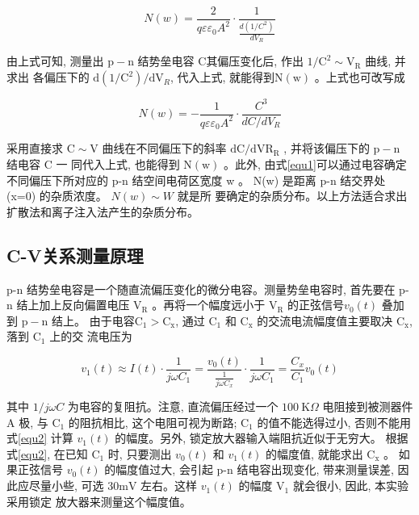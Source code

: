\documentclass{buaaemp}
\begin{document}
\begin{equation*}
    N(w)=\frac{2}{q \varepsilon \varepsilon_{0} A^{2}} \cdot \frac{1}{\frac{d\left(1 / C^{2}\right)}{d V_{R}}}
\end{equation*}

由上式可知, 测量出 $ \mathrm{p}-\mathrm{n}$  结势垒电容 $ \mathrm{C}  $其偏压变化后, 作出 $ 1 / \mathrm{C}^{2} \sim \mathrm{V}_{\mathrm{R}} $ 曲线, 并求出 各偏压下的 $ \mathrm{d}\left(1 / \mathrm{C}^{2}\right) / \mathrm{dV}_{R} $, 代入上式, 就能得到$  \mathrm{N}(\mathrm{w})$  。上式也可改写成

\begin{equation*}
    N(w)=-\frac{1}{q \varepsilon \varepsilon_{0} A^{2}} \cdot \frac{C^{3}}{d C / d V_{R}}
\end{equation*}

采用直接求 $ \mathrm{C} \sim \mathrm{V}$  曲线在不同偏压下的斜率 $ \mathrm{dC} / \mathrm{dV} \mathrm{R}_{\mathrm{R}}$ , 并将该偏压下的 $ \mathrm{p}-\mathrm{n}$  结电容 $ \mathrm{C}$ 一  同代入上式, 也能得到 $ \mathrm{N}(\mathrm{w}) $ 。此外, 由式\ref{equ1}可以通过电容确定不同偏压下所对应的  p-n  结空间电荷区宽度  w 。 N(w)  是距离  p-n  结交界处  (x=0)  的杂质浓度。 $ N(w) \sim W$  就是所 要确定的杂质分布。以上方法适合求出扩散法和离子注入法产生的杂质分布。
\subsection{C-V关系测量原理}\cite{钱建强2016近代物理实验}
 p-n  结势垒电容是一个随直流偏压变化的微分电容。测量势垒电容时, 首先要在 p-n 结上加上反向偏置电压 $ \mathrm{V}_{\mathrm{R}}$  。再将一个幅度远小于  $\mathrm{V}_{\mathrm{R}}$  的正弦信号$  v_{0}(t) $ 叠加到 $ \mathrm{p}-\mathrm{n} $ 结上。 由于电容$  \mathrm{C}_{1}>\mathrm{C}_{\mathrm{x}} $, 通过  $\mathrm{C}_{1} $ 和  $\mathrm{C}_{\mathrm{x}}$  的交流电流幅度值主要取决 $ \mathrm{C}_{\mathrm{x}} $, 落到 $ \mathrm{C}_{1} $ 上的交 流电压为

\begin{equation}
    v_{1}(t) \approx I(t) \cdot \frac{1}{j \omega C_{1}}=\frac{v_{0}(t)}{\frac{1}{j \omega C_{x}}} \cdot \frac{1}{j \omega C_{1}}=\frac{C_{x}}{C_{1}} v_{0}(t) \label{equ2}
\end{equation}

其中 $ 1 / j \omega C $ 为电容的复阻抗。注意, 直流偏压经过一个 $ 100 \mathrm{~K} \Omega $ 电阻接到被测器件 $ \mathrm{A}$  极, 与 $ \mathrm{C}_{1}$  的阻抗相比, 这个电阻可视为断路;  $\mathrm{C}_{1}$  的值不能选得过小, 否则不能用式\ref{equ2} 计算  $v_{1}(t)$  的幅度。另外, 锁定放大器输入端阻抗近似于无穷大。
根据式\ref{equ2}, 在已知 $ \mathrm{C}_{1}$  时, 只要测出  $v_{0}(t) $ 和  $v_{1}(t)$  的幅度值, 就能求出 $ \mathrm{C}_{\mathrm{x}}$  。 如果正弦信号  $v_{0}(t) $ 的幅度值过大, 会引起 p-n 结电容出现变化, 带来测量误差, 因 此应尽量小些, 可选  $30 \mathrm{mV} $ 左右。这样 $ v_{1}(t) $ 的幅度  $\mathrm{V}_{1}$  就会很小, 因此, 本实验采用锁定 放大器来测量这个幅度值。
\end{document}
